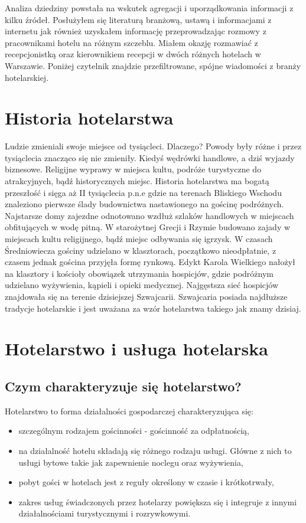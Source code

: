 \documentclass[a4paper,onecolumn,oneside,11pt,wide,floatssmall]{mwrep}
\theoremstyle{definition}
\theoremstyle{plain}%
\theoremstyle{remark}
\begin{document}
Analiza dziedziny powstała na wskutek agregacji i uporządkowania informacji 
z kilku źródeł. Posłużyłem się literaturą branżową, ustawą i informacjami z 
internetu jak również uzyskałem informację przeprowadzając rozmowy z 
pracownikami hotelu na różnym szczeblu. Miałem okazję rozmawiać z 
recepcjonistką oraz kierownikiem recepcji w dwóch różnych hotelach w 
Warszawie. Poniżej czytelnik znajdzie przefiltrowane, spójne wiadomości z 
branży hotelarskiej.


\section{Historia hotelarstwa} 

Ludzie zmieniali swoje miejsce od tysiącleci. Dlaczego? Powody były różne i 
przez tysiąclecia znacząco się nie zmieniły. Kiedyś wędrówki handlowe, a 
dziś wyjazdy biznesowe. Religijne wyprawy w miejsca kultu, podróże 
turystyczne do atrakcyjnych, bądź historycznych miejsc.     Historia 
hotelarstwa ma bogatą przeszłość i sięga aż II tysiąclecia p.n.e gdzie na 
terenach Bliskiego Wschodu znaleziono pierwsze ślady budownictwa 
nastawionego na gościnę podróżnych. Najstarsze domy zajezdne odnotowano 
wzdłuż szlaków handlowych w miejscach obfitujących w wodę pitną. W 
starożytnej Grecji i Rzymie budowano zajady w miejscach kultu religijnego, 
bądź miejsc odbywania się igrzysk. W czasach Średniowiecza gościny udzielano 
w klasztorach, początkowo nieodpłatnie, z czasem jednak gościna przyjęła 
formę rynkową. Edykt Karola Wielkiego nałożył na klasztory i kościoły 
obowiązek utrzymania hospicjów, gdzie podróżnym udzielano wyżywienia, 
kąpieli i opieki medycznej. Najgęstsza sieć hospicjów znajdowała się na 
terenie dzisiejszej Szwajcarii. Szwajcaria posiada najdłuższe tradycje 
hotelarskie i jest uważana za wzór hotelarstwa takiego jak znamy dzisiaj.


\section{Hotelarstwo i usługa hotelarska}

\subsection{Czym charakteryzuje się hotelarstwo?}

Hotelarstwo to forma działalności gospodarczej charakteryzująca się:
\begin{itemize} 
  \item szczególnym rodzajem gościnności - gościnność za odpłatnością,
  \item na działalność hotelu składają się różnego rodzaju usługi. Główne z 
  nich to usługi bytowe takie jak zapewnienie noclegu oraz wyżywienia,
  \item pobyt gości w hotelach jest z reguły określony w czasie i 
  krótkotrwały,
  \item zakres usług świadczonych przez hotelarzy powiększa się i integruje 
  z innymi działalnościami turystycznymi i rozrywkowymi.
\end{itemize}
\end{document}
